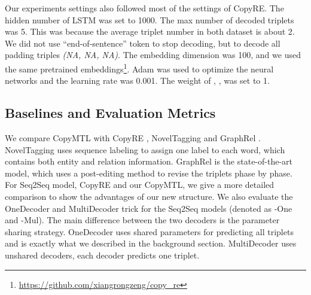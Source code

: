 \documentclass[letterpaper]{article} \usepackage{aaai20}  \usepackage{times}  \usepackage{helvet} \usepackage{courier}  \usepackage[hyphens]{url}  \usepackage{graphicx}
\begin{document}
      Our experiments settings also followed most of the settings of CopyRE.
      The hidden number of LSTM was set to 1000.  
      The max number of decoded triplets was 5. This was because the average triplet number in both dataset is about 2. We did not use ``end-of-sentence'' token to stop decoding, but to decode all padding triples \textit{(NA, NA, NA)}.
      The embedding dimension was 100, and we used the same pretrained embeddings\footnote{\url{https://github.com/xiangrongzeng/copy_re}}.
      Adam \cite{Adam} was used to optimize the neural networks and the learning rate was 0.001. The weight of , , was set to 1. 


    
  \subsection{Baselines and Evaluation Metrics}
   


  
  
We compare CopyMTL with CopyRE \cite{CopyRE}, NovelTagging \cite{novel_tagging} and GraphRel \cite{graphrel}. NovelTagging uses sequence labeling to assign one label to each word, which contains both entity and relation information. GraphRel is the state-of-the-art model, which uses a post-editing method to revise the triplets phase by phase. For Seq2Seq model, CopyRE and our CopyMTL, we give a more detailed comparison to show the advantages of our new structure.
We also evaluate the OneDecoder and MultiDecoder trick for the Seq2Seq models (denoted as -One and -Mul).
      The main difference between the two decoders is the parameter sharing strategy. OneDecoder uses shared parameters for predicting all triplets and is exactly what we described in the background section.
MultiDecoder uses unshared decoders, each decoder predicts one triplet.
\end{document}
